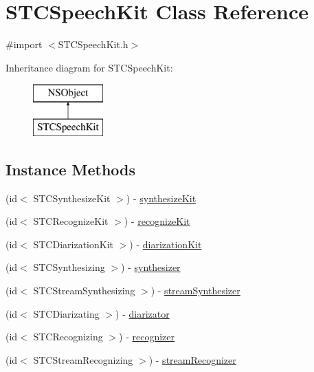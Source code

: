 \hypertarget{interface_s_t_c_speech_kit}{}\section{S\+T\+C\+Speech\+Kit Class Reference}
\label{interface_s_t_c_speech_kit}


{\ttfamily \#import $<$S\+T\+C\+Speech\+Kit.\+h$>$}

Inheritance diagram for S\+T\+C\+Speech\+Kit\+:\begin{figure}[H]
\begin{center}
\leavevmode
\includegraphics[height=2.000000cm]{interface_s_t_c_speech_kit}
\end{center}
\end{figure}
\subsection*{Instance Methods}
\begin{DoxyCompactItemize}
\item 
(id$<$ S\+T\+C\+Synthesize\+Kit $>$) -\/ \hyperlink{interface_s_t_c_speech_kit_ae2ffb20a43cc5c82600a73bd845dee63}{synthesize\+Kit}
\item 
(id$<$ S\+T\+C\+Recognize\+Kit $>$) -\/ \hyperlink{interface_s_t_c_speech_kit_ae37afef806110cd42e7cb55cb3ed1bab}{recognize\+Kit}
\item 
(id$<$ S\+T\+C\+Diarization\+Kit $>$) -\/ \hyperlink{interface_s_t_c_speech_kit_ad246bb671e520e5f1b90810f2e312dbf}{diarization\+Kit}
\item 
(id$<$ S\+T\+C\+Synthesizing $>$) -\/ \hyperlink{interface_s_t_c_speech_kit_a10aeaaaa028124b2238619b7fcf1ee27}{synthesizer}
\item 
(id$<$ S\+T\+C\+Stream\+Synthesizing $>$) -\/ \hyperlink{interface_s_t_c_speech_kit_a9574e9a1980085752a5f7b06ab7fe28c}{stream\+Synthesizer}
\item 
(id$<$ S\+T\+C\+Diarizating $>$) -\/ \hyperlink{interface_s_t_c_speech_kit_aef8919d819020556e6f2c363ff65516a}{diarizator}
\item 
(id$<$ S\+T\+C\+Recognizing $>$) -\/ \hyperlink{interface_s_t_c_speech_kit_abed4ce3b3fa01be3562296c1e03a46c1}{recognizer}
\item 
(id$<$ S\+T\+C\+Stream\+Recognizing $>$) -\/ \hyperlink{interface_s_t_c_speech_kit_a1c6172cd2dd62d8378c2e706ab3ad8f7}{stream\+Recognizer}
\end{DoxyCompactItemize}
